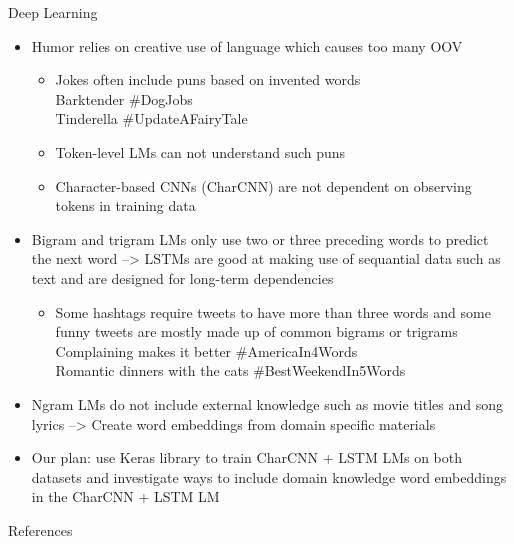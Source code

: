 \documentclass[final]{beamer}
\newlength{\onecolwid}
\begin{document}
\begin{frame}[t]
\begin{columns}[t]
\begin{column}{\onecolwid}
\begin{block}{Deep Learning}
\begin{itemize}
\item Humor relies on creative use of language which causes too many OOV 
\begin{itemize}
\item \large Jokes often include puns based on invented words
\\ {\hfil \normalsize Barktender \#DogJobs}
\\ {\hfil \normalsize Tinderella \#UpdateAFairyTale}
\item Token-level LMs can not understand such puns
\item Character-based CNNs (CharCNN) are not dependent on observing tokens in training data
\end{itemize}	
\item Bigram and trigram LMs only use two or three preceding words to predict the next word --> LSTMs are good at making use of sequantial data such as text and are designed for long-term dependencies
\begin{itemize}
\item \large Some hashtags require tweets to have more than three words and some funny tweets are mostly made up of common bigrams or trigrams
\\ {\hfil \normalsize Complaining makes it better \#AmericaIn4Words}
\\ {\hfil \normalsize Romantic dinners with the cats \#BestWeekendIn5Words} 
\end{itemize}
\item Ngram LMs do not include external knowledge such as movie titles and song lyrics --> Create word embeddings from domain specific materials
\item Our plan: use Keras library to train CharCNN + LSTM LMs on both datasets and investigate ways to include domain knowledge word embeddings in the CharCNN + LSTM LM

\end{itemize}

\end{block}


\begin{block}{References}

\nocite{*} %
\tiny{
\vspace{0.75in}}


\end{block}
\end{column}
\end{columns}
\end{frame}
\end{document}

